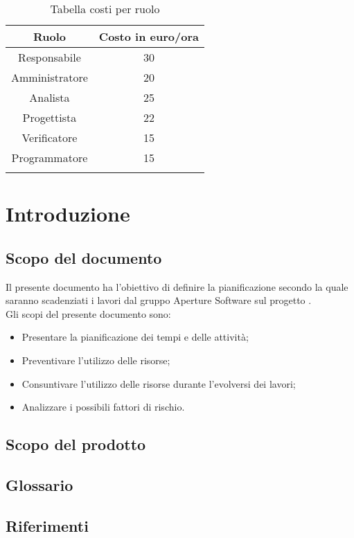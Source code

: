 \begin{center}
\begin{longtable}{|c|c|}
\toprule
\textbf{Ruolo} & \textbf{Costo in euro/ora}\\
\midrule
Responsabile & 30\\
Amministratore & 20\\
Analista & 25\\
Progettista & 22\\
Verificatore & 15\\
Programmatore & 15\\
\bottomrule
\caption{Tabella costi per ruolo}
\label{tab:costiruolo}
\end{longtable}
\end{center} 


\newpage
\section{Introduzione}
\label{3.0}
\subsection{Scopo del documento}
\label{3.1}
Il presente documento ha l'obiettivo di definire la pianificazione secondo la quale saranno scadenziati i lavori dal gruppo Aperture Software sul progetto \Progetto{}.\\

Gli scopi del presente documento sono:
\begin{itemize}
\item Presentare la pianificazione dei tempi e delle attività;
\item Preventivare l'utilizzo delle risorse;
\item Consuntivare l'utilizzo delle risorse durante l'evolversi dei lavori;
\item Analizzare i possibili fattori di rischio.
\end{itemize}

\subsection{Scopo del prodotto}
\label{3.2}
\Prodotto{}

\subsection{Glossario}
\label{3.3}
\Glossario{}

\subsection{Riferimenti}
\label{3.4}
